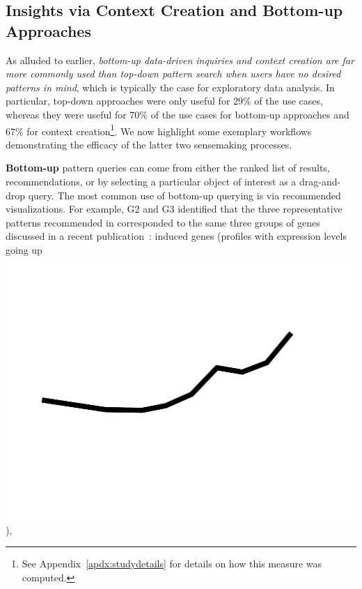  \subsection{Insights via Context Creation and Bottom-up Approaches}%
 \par As alluded to earlier,
 \emph{bottom-up data-driven inquiries
 and context creation are far more commonly
 used than top-down pattern search
 when users have no desired patterns in mind},
 which is typically the case for exploratory data analysis.
 In particular, top-down approaches were only useful for 29\% of the use cases,
 whereas they were useful for 70\% of the use cases
 for bottom-up approaches and 67\%
 for context creation\footnote{See Appendix~\ref{apdx:studydetails} for details on how this measure was computed.}. We now highlight some exemplary workflows demonstrating the efficacy of the latter two sensemaking processes.
 \par \textbf{Bottom-up }pattern queries can come from either
 the ranked list of results,
 recommendations, or by selecting a
 particular object of interest as a drag-and-drop query. 
 The most common use of bottom-up querying
 is via recommended visualizations. For example, G2 and G3 identified that
 the three representative patterns
 recommended in \zvpp corresponded
 to the same three groups of genes discussed
 in a recent publication~\cite{Gloss2017}:
 induced genes (profiles with expression levels going up \includegraphics[width=2\baselineskip,keepaspectratio]{figures/up.pdf}),
